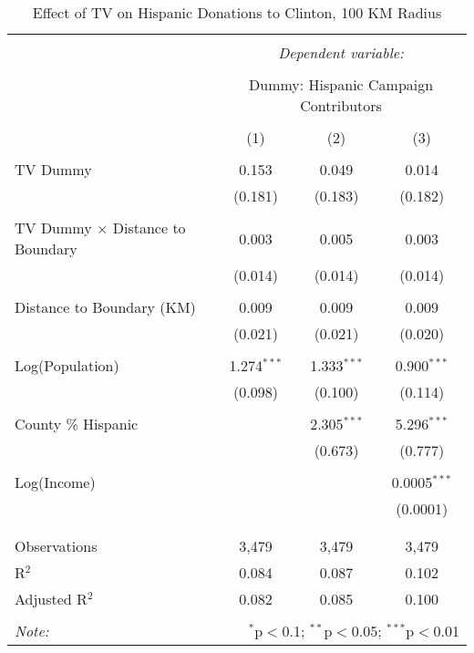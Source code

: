 
\begin{table}[!htbp] \centering 
  \caption{Effect of TV on Hispanic Donations to Clinton, 100 KM Radius} 
  \label{} 
\begin{tabular}{@{\extracolsep{-5pt}}lccc} 
\\[-1.8ex]\hline 
\hline \\[-1.8ex] 
 & \multicolumn{3}{c}{\textit{Dependent variable:}} \\ 
\cline{2-4} 
\\[-1.8ex] & \multicolumn{3}{c}{Dummy: Hispanic Campaign Contributors} \\ 
\\[-1.8ex] & (1) & (2) & (3)\\ 
\hline \\[-1.8ex] 
 TV Dummy & 0.153 & 0.049 & 0.014 \\ 
  & (0.181) & (0.183) & (0.182) \\ 
  & & & \\ 
 TV Dummy $\times$ Distance to Boundary  & 0.003 & 0.005 & 0.003 \\ 
  & (0.014) & (0.014) & (0.014) \\ 
  & & & \\ 
 Distance to Boundary (KM) & 0.009 & 0.009 & 0.009 \\ 
  & (0.021) & (0.021) & (0.020) \\ 
  & & & \\ 
 Log(Population) & 1.274$^{***}$ & 1.333$^{***}$ & 0.900$^{***}$ \\ 
  & (0.098) & (0.100) & (0.114) \\ 
  & & & \\ 
 County \% Hispanic &  & 2.305$^{***}$ & 5.296$^{***}$ \\ 
  &  & (0.673) & (0.777) \\ 
  & & & \\ 
 Log(Income) &  &  & 0.0005$^{***}$ \\ 
  &  &  & (0.0001) \\ 
  & & & \\ 
\hline \\[-1.8ex] 
Observations & 3,479 & 3,479 & 3,479 \\ 
R$^{2}$ & 0.084 & 0.087 & 0.102 \\ 
Adjusted R$^{2}$ & 0.082 & 0.085 & 0.100 \\ 
\hline 
\hline \\[-1.8ex] 
\textit{Note:}  & \multicolumn{3}{r}{$^{*}$p$<$0.1; $^{**}$p$<$0.05; $^{***}$p$<$0.01} \\ 
\end{tabular} 
\end{table} 
